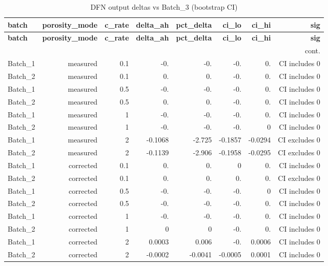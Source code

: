 \documentclass[11pt,a4paper]{article}
\begin{document}
\normalsize
\scriptsize
\begin{longtable}{lrrrrrrr}
\caption{DFN output deltas vs Batch\_3 (bootstrap CI)}\label{tab:dfndeltas}\\
\toprule
\textbf{batch} & \textbf{porosity\_mode} & \textbf{c\_rate} & \textbf{delta\_ah} & \textbf{pct\_delta} & \textbf{ci\_lo} & \textbf{ci\_hi} & \textbf{sig} \\
\midrule
\endfirsthead
\toprule \textbf{batch} & \textbf{porosity\_mode} & \textbf{c\_rate} & \textbf{delta\_ah} & \textbf{pct\_delta} & \textbf{ci\_lo} & \textbf{ci\_hi} & \textbf{sig} \\
\midrule
\endhead
\midrule\multicolumn{8}{r}{\footnotesize cont.}\\\midrule\endfoot
\bottomrule\endlastfoot
Batch\_1 & measured & 0.1 & -0. & -0. & -0. & 0. & CI includes 0 \\
Batch\_2 & measured & 0.1 & 0. & 0. & -0. & 0. & CI includes 0 \\
Batch\_1 & measured & 0.5 & -0. & -0. & -0. & 0. & CI includes 0 \\
Batch\_2 & measured & 0.5 & 0. & 0. & -0. & 0. & CI includes 0 \\
Batch\_1 & measured & 1 & -0. & -0. & -0. & 0. & CI includes 0 \\
Batch\_2 & measured & 1 & -0. & -0. & -0. & 0 & CI includes 0 \\
Batch\_1 & measured & 2 & -0.1068 & -2.725 & -0.1857 & -0.0294 & CI excludes 0 \\
Batch\_2 & measured & 2 & -0.1139 & -2.906 & -0.1958 & -0.0295 & CI excludes 0 \\
Batch\_1 & corrected & 0.1 & 0. & 0. & 0 & 0. & CI includes 0 \\
Batch\_2 & corrected & 0.1 & 0. & 0. & 0. & 0. & CI excludes 0 \\
Batch\_1 & corrected & 0.5 & -0. & -0. & -0. & 0 & CI includes 0 \\
Batch\_2 & corrected & 0.5 & -0. & -0. & -0. & 0. & CI includes 0 \\
Batch\_1 & corrected & 1 & -0. & -0. & -0. & 0. & CI includes 0 \\
Batch\_2 & corrected & 1 & 0 & 0 & -0. & 0. & CI includes 0 \\
Batch\_1 & corrected & 2 & 0.0003 & 0.006 & -0. & 0.0006 & CI includes 0 \\
Batch\_2 & corrected & 2 & -0.0002 & -0.0041 & -0.0005 & 0.0001 & CI includes 0 \\
\end{longtable}
\end{document}
